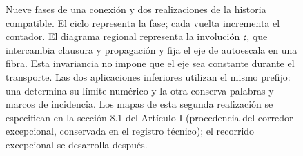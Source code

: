 \begin{figure}[!htbp]
\caption{\fontsize{9}{11}\selectfont Nueve fases de una conexión y dos realizaciones de la historia
compatible. El ciclo representa la fase; cada vuelta incrementa el contador.
El diagrama regional representa la involución \(\mathfrak c\), que
intercambia clausura y propagación y fija el eje de autoescala en una fibra.
Esta invariancia no impone que el eje sea constante durante el transporte.
Las dos aplicaciones inferiores utilizan el mismo prefijo: una determina
su límite numérico y la otra conserva palabras y marcos de incidencia. Los
mapas de esta segunda realización se especifican en la sección
8.1 del Artículo I (procedencia del corredor excepcional, conservada en el registro técnico); el recorrido excepcional se desarrolla después.}
\label{mono-ampl:fig-regional}
\end{figure}
